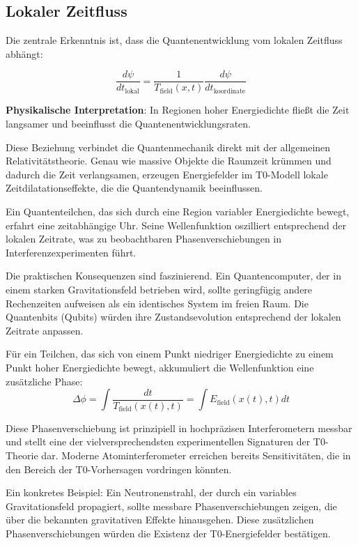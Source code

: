 \documentclass[12pt,a4paper]{article}
\theoremstyle{definition}
\theoremstyle{remark}
\begin{document}
\subsection{Lokaler Zeitfluss}

Die zentrale Erkenntnis ist, dass die Quantenentwicklung vom lokalen Zeitfluss abhängt:

\begin{equation}
	\frac{d\psi}{dt_{\text{lokal}}} = \frac{1}{T_{\text{field}}(x,t)} \frac{d\psi}{dt_{\text{koordinate}}}
	\label{eq:local_time_flow}
\end{equation}

\textbf{Physikalische Interpretation}: In Regionen hoher Energiedichte fließt die Zeit langsamer und beeinflusst die Quantenentwicklungsraten.

Diese Beziehung verbindet die Quantenmechanik direkt mit der allgemeinen Relativitätstheorie. Genau wie massive Objekte die Raumzeit krümmen und dadurch die Zeit verlangsamen, erzeugen Energiefelder im T0-Modell lokale Zeitdilatationseffekte, die die Quantendynamik beeinflussen.

Ein Quantenteilchen, das sich durch eine Region variabler Energiedichte bewegt, erfahrt eine zeitabhängige Uhr. Seine Wellenfunktion oszilliert entsprechend der lokalen Zeitrate, was zu beobachtbaren Phasenverschiebungen in Interferenzexperimenten führt.

Die praktischen Konsequenzen sind faszinierend. Ein Quantencomputer, der in einem starken Gravitationsfeld betrieben wird, sollte geringfügig andere Rechenzeiten aufweisen als ein identisches System im freien Raum. Die Quantenbits (Qubits) würden ihre Zustandsevolution entsprechend der lokalen Zeitrate anpassen.

Für ein Teilchen, das sich von einem Punkt niedriger Energiedichte zu einem Punkt hoher Energiedichte bewegt, akkumuliert die Wellenfunktion eine zusätzliche Phase:
$$\Delta \phi = \int \frac{dt}{T_{\text{field}}(x(t), t)} = \int E_{\text{field}}(x(t), t) dt$$

Diese Phasenverschiebung ist prinzipiell in hochpräzisen Interferometern messbar und stellt eine der vielversprechendsten experimentellen Signaturen der T0-Theorie dar. Moderne Atominterferometer erreichen bereits Sensitivitäten, die in den Bereich der T0-Vorhersagen vordringen könnten.

Ein konkretes Beispiel: Ein Neutronenstrahl, der durch ein variables Gravitationsfeld propagiert, sollte messbare Phasenverschiebungen zeigen, die über die bekannten gravitativen Effekte hinausgehen. Diese zusätzlichen Phasenverschiebungen würden die Existenz der T0-Energiefelder bestätigen.
\end{document}
